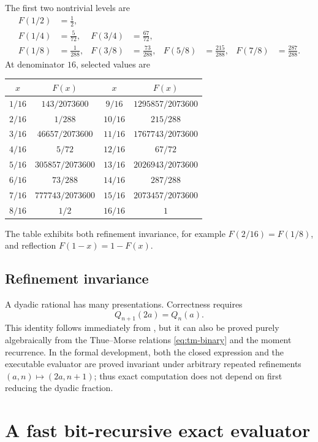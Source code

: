 \documentclass[11pt]{article}
\numberwithin{equation}{section}
\theoremstyle{definition}
\theoremstyle{remark}
\begin{document}
The first two nontrivial levels are
\begin{align*}
 F(1/2)&=\frac12,\\
 F(1/4)&=\frac5{72},&F(3/4)&=\frac{67}{72},\\
 F(1/8)&=\frac1{288},&F(3/8)&=\frac{73}{288},
 &F(5/8)&=\frac{215}{288},&F(7/8)&=\frac{287}{288}.
\end{align*}
At denominator $16$, selected values are
\begin{center}
\begin{tabular}{@{}c@{\qquad}c@{\qquad}c@{\qquad}c@{}}
\toprule
$x$ & $F(x)$ & $x$ & $F(x)$\\
\midrule
$1/16$ & $143/2073600$ & $9/16$ & $1295857/2073600$\\
$2/16$ & $1/288$       & $10/16$& $215/288$\\
$3/16$ & $46657/2073600$ & $11/16$& $1767743/2073600$\\
$4/16$ & $5/72$        & $12/16$& $67/72$\\
$5/16$ & $305857/2073600$ & $13/16$& $2026943/2073600$\\
$6/16$ & $73/288$      & $14/16$& $287/288$\\
$7/16$ & $777743/2073600$ & $15/16$& $2073457/2073600$\\
$8/16$ & $1/2$         & $16/16$& $1$\\
\bottomrule
\end{tabular}
\end{center}
The table exhibits both refinement invariance, for example
$F(2/16)=F(1/8)$, and reflection $F(1-x)=1-F(x)$.

\subsection{Refinement invariance}

A dyadic rational has many presentations.  Correctness requires
\begin{equation}\label{eq:Q-refinement}
 Q_{n+1}(2a)=Q_n(a).
\end{equation}
This identity follows immediately from , but it can
also be proved purely algebraically from the Thue--Morse relations
\eqref{eq:tm-binary} and the moment recurrence.  In the formal development,
both the closed expression and the executable evaluator are proved invariant
under arbitrary repeated refinements $(a,n)\mapsto(2a,n+1)$; thus exact
computation does not depend on first reducing the dyadic fraction.

\section{A fast bit-recursive exact evaluator}\label{sec:bit-recursion}
\end{document}
